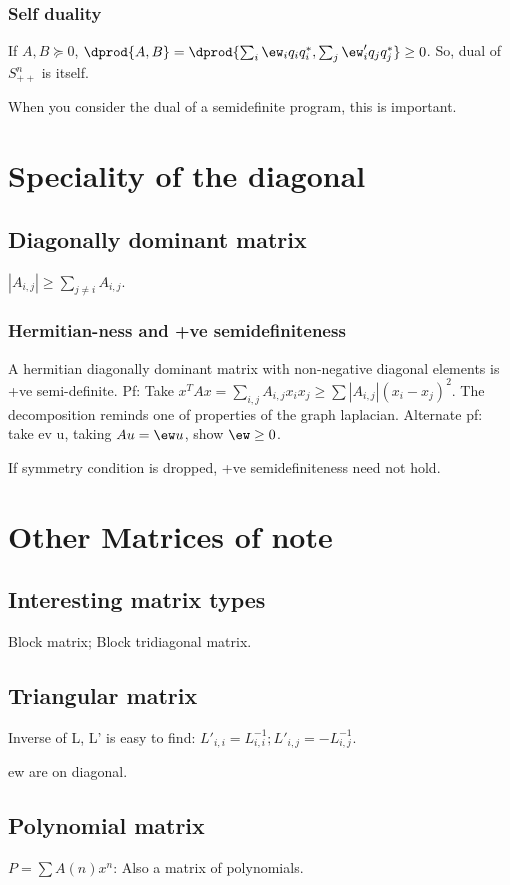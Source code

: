 \documentclass[oneside, article]{memoir}
\begin{document}
\subsubsection{Self duality}
If $A, B \succeq 0$, $\dprod{A, B} = \dprod{\sum_i \ew_i q_i q_i^{*}, \sum_j \ew'_i q_j q_j^{*}} \geq 0$. So, dual of $S_{++}^{n}$ is itself.

When you consider the dual of a semidefinite program, this is important.

\section{Speciality of the diagonal}
\subsection{Diagonally dominant matrix}
$|A_{i,j}| \geq \sum_{j \neq i} A_{i,j}$.

\subsubsection{Hermitian-ness and +ve semidefiniteness}
A hermitian diagonally dominant matrix with non-negative diagonal elements is +ve semi-definite. Pf: Take $x^{T}Ax = \sum_{i,j} A_{i,j}x_i x_j \geq \sum |A_{i,j}|(x_i - x_j)^{2}$. The decomposition reminds one of properties of the graph laplacian. Alternate pf: take ev u, taking $Au = \ew u$, show $\ew \geq 0$.

If symmetry condition is dropped, +ve semidefiniteness need not hold.


\section{Other Matrices of note}
\subsection{Interesting matrix types}
Block matrix; Block tridiagonal matrix.

\subsection{Triangular matrix}
Inverse of L, L' is easy to find: $L'_{i,i} = L_{i,i}^{-1}; L'_{i, j} = -L_{i,j}^{-1}$.

ew are on diagonal.

\subsection{Polynomial matrix}
$P = \sum A(n)x^{n}$: Also a matrix of polynomials.
\end{document}
